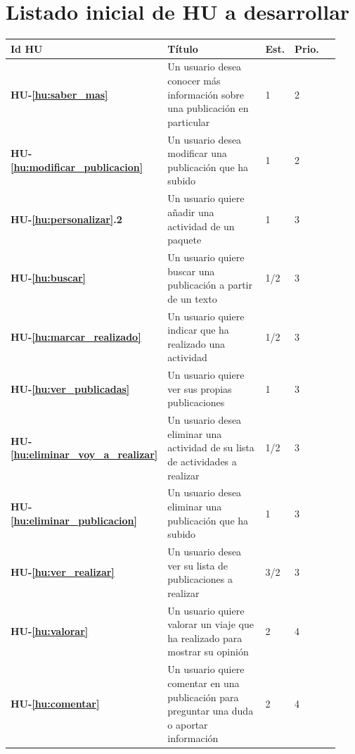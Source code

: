 \documentclass[11pt]{article}
\begin{document}
\section{Listado inicial de HU a desarrollar}
\begin{longtable}{p{0.13\linewidth}p{0.65\linewidth}p{0.05\linewidth}p{0.05\linewidth}p{0.05\linewidth}}
  \toprule
  \textbf{Id HU} & \textbf{Título} & \textbf{Est.} & \textbf{Prio.}\\
  \midrule
  \textbf{HU-\ref{hu:saber_mas}} & Un usuario desea conocer más información sobre una publicación en particular & 1 & 2 \\

  \textbf{HU-\ref{hu:modificar_publicacion}} & Un usuario desea modificar una publicación que ha subido & 1 & 2 \\	
  
  \textbf{HU-\ref{hu:personalizar}.2} & Un usuario quiere añadir una actividad de un paquete & 1 & 3 \\ 	

  \textbf{HU-\ref{hu:buscar}} & Un usuario quiere buscar una publicación a partir de un texto & 1/2 & 3 \\

  \textbf{HU-\ref{hu:marcar_realizado}} & Un usuario quiere indicar que ha realizado una actividad & 1/2 & 3 \\
  
  \textbf{HU-\ref{hu:ver_publicadas}} & Un usuario quiere ver sus propias publicaciones & 1 & 3 \\
  
  \textbf{HU-\ref{hu:eliminar_voy_a_realizar}} & Un usuario desea eliminar una actividad de su lista de actividades a realizar & 1/2 & 3 \\	
  
  \textbf{HU-\ref{hu:eliminar_publicacion}} & Un usuario desea eliminar una publicación que ha subido & 1 & 3 \\	
  
    \textbf{HU-\ref{hu:ver_realizar}} & Un usuario desea ver su lista de publicaciones a realizar & 3/2 & 3\\

  \textbf{HU-\ref{hu:valorar}} & Un usuario quiere valorar un viaje que ha realizado para mostrar su opinión & 2 & 4\\

  \textbf{HU-\ref{hu:comentar}} & Un usuario quiere comentar en una publicación para preguntar una duda o aportar información & 2 & 4\\



  
  \bottomrule
\end{longtable}
\end{document}
